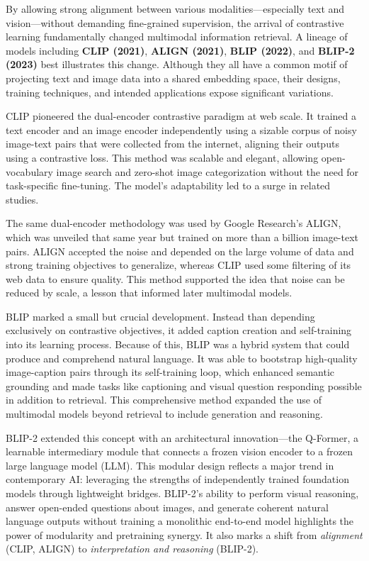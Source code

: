 \documentclass[conference]{IEEEtran}
\begin{document}
By allowing strong alignment between various modalities—especially text and vision—without demanding fine-grained supervision, the arrival of contrastive learning fundamentally changed multimodal information retrieval. A lineage of models including \textbf{CLIP (2021)}, \textbf{ALIGN (2021)}, \textbf{BLIP (2022)}, and \textbf{BLIP-2 (2023)} best illustrates this change. Although they all have a common motif of projecting text and image data into a shared embedding space, their designs, training techniques, and intended applications expose significant variations.

CLIP pioneered the dual-encoder contrastive paradigm at web scale. It trained a text encoder and an image encoder independently using a sizable corpus of noisy image-text pairs that were collected from the internet, aligning their outputs using a contrastive loss. This method was scalable and elegant, allowing open-vocabulary image search and zero-shot image categorization without the need for task-specific fine-tuning. The model's adaptability led to a surge in related studies.

The same dual-encoder methodology was used by Google Research's ALIGN, which was unveiled that same year but trained on more than a billion image-text pairs. ALIGN accepted the noise and depended on the large volume of data and strong training objectives to generalize, whereas CLIP used some filtering of its web data to ensure quality. This method supported the idea that noise can be reduced by scale, a lesson that informed later multimodal models.

BLIP marked a small but crucial development. Instead than depending exclusively on contrastive objectives, it added caption creation and self-training into its learning process. Because of this, BLIP was a hybrid system that could produce and comprehend natural language. It was able to bootstrap high-quality image-caption pairs through its self-training loop, which enhanced semantic grounding and made tasks like captioning and visual question responding possible in addition to retrieval. This comprehensive method expanded the use of multimodal models beyond retrieval to include generation and reasoning.

BLIP-2 extended this concept with an architectural innovation—the Q-Former, a learnable intermediary module that connects a frozen vision encoder to a frozen large language model (LLM). This modular design reflects a major trend in contemporary AI: leveraging the strengths of independently trained foundation models through lightweight bridges. BLIP-2’s ability to perform visual reasoning, answer open-ended questions about images, and generate coherent natural language outputs without training a monolithic end-to-end model highlights the power of modularity and pretraining synergy. It also marks a shift from \textit{alignment} (CLIP, ALIGN) to \textit{interpretation and reasoning} (BLIP-2).
\end{document}
